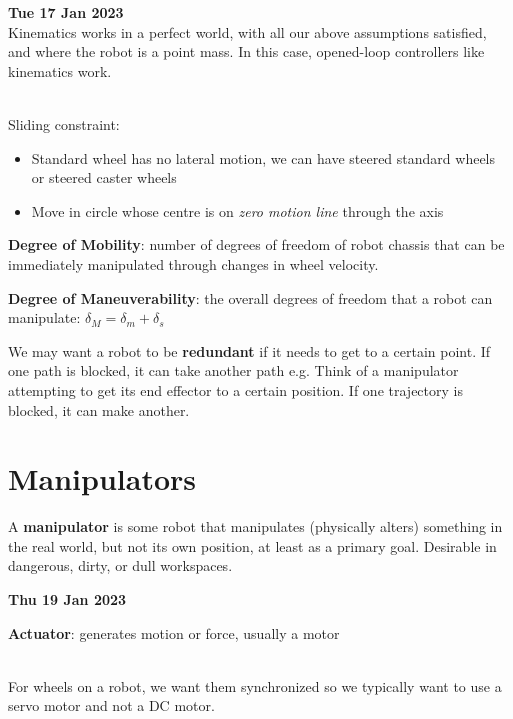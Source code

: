 \documentclass[13pt]{article}
\begin{document}
\hfill

\hfill \textbf{Tue 17 Jan 2023} \\

\noindent
Kinematics works in a perfect world, with all our above assumptions satisfied, and where the robot is a point mass. In
this case, opened-loop controllers like kinematics work.

\hfill \\

\noindent
Sliding constraint:
\begin{itemize}
	\item Standard wheel has no lateral motion, we can have steered standard wheels or steered caster wheels
	\item Move in circle whose centre is on \textit{zero motion line} through the axis
\end{itemize}

\hfill

\noindent
\textbf{Degree of Mobility}: number of degrees of freedom of robot chassis that can be immediately manipulated through
changes in wheel velocity.

\hfill

\noindent
\textbf{Degree of Maneuverability}: the overall degrees of freedom that a robot can manipulate: $\delta_{M} = \delta_{m}
+ \delta_{s}$

\hfill

\noindent
We may want a robot to be \textbf{redundant} if it needs to get to a certain point. If one path is blocked, it can take
another path e.g. Think of a manipulator attempting to get its end effector to a certain position. If one trajectory is
blocked, it can make another.

\section{Manipulators}%

A \textbf{manipulator} is some robot that manipulates (physically alters) something in the real world, but not its own
position, at least as a primary goal. Desirable in dangerous, dirty, or dull workspaces.

\hfill

\hfill \textbf{Thu 19 Jan 2023}

\hfill

\noindent
\textbf{Actuator}: generates motion or force, usually a motor

\hfill \\
\noindent
For wheels on a robot, we want them synchronized so we typically want to use a servo motor and not a DC motor.

\hfill \\
\noindent
\end{document}
